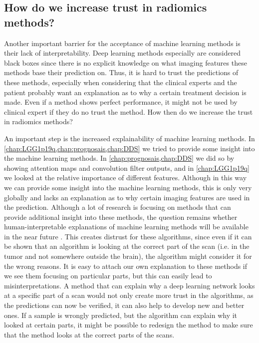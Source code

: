 \subsection{How do we increase trust in radiomics methods?}

Another important barrier for the acceptance of machine learning methods is their lack of interpretability.
Deep learning methods especially are considered black boxes since there is no explicit knowledge on what imaging features these methods base their prediction on.
Thus, it is hard to trust the predictions of these methods, especially when considering that the clinical experts and the patient probably want an explanation as to why a certain treatment decision is made.
Even if a method shows perfect performance, it might not be used by clinical expert if they do no trust the method.
How then do we increase the trust in radiomics methods?

An important step is the increased explainability of machine learning methods.
In \cref{chap:LGG1p19q,chap:prognosais,chap:DDS} we  tried to provide some insight into the machine learning methods.
In \cref{chap:prognosais,chap:DDS} we did so by showing attention maps and convolution filter outputs, and in \cref{chap:LGG1p19q} we looked at the relative importance of different features.
Although in this way we can provide some insight into the machine learning methods, this is only very globally and lacks an explanation as to why certain imaging features are used in the prediction.
Although a lot of research is focusing on methods that can provide additional insight into these methods, the question remains whether human-interpretable explanations of machine learning methods will be available in the near future \autocite{zhang2018interpretable}.
This creates distrust for these algorithms, since even if it can be shown that an algorithm is looking at the correct part of the scan (i.e. in the tumor and not somewhere outside the brain), the algorithm might consider it for the wrong reasons.
It is easy to attach our own explanation to these methods if we see them focusing on particular parts, but this can easily lead to misinterpretations.
A method that can explain why a deep learning network looks at a specific part of a scan would not only create more trust in the algorithms, as the predictions can now be verified, it can also help to develop new and better ones.
If a sample is wrongly predicted, but the algorithm can explain why it looked at certain parts, it might be possible to redesign the method to make sure that the method looks at the correct parts of the scans.

